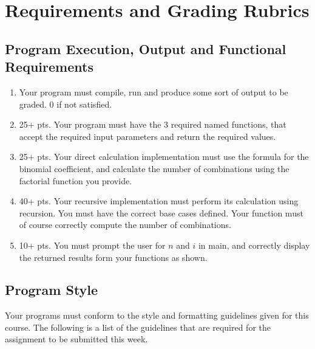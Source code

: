 \documentclass[11pt]{article}
\begin{document}
\section*{Requirements and Grading Rubrics}
\label{sec-5}
\subsection*{Program Execution, Output and Functional Requirements}
\label{sec-5-1}


\begin{enumerate}
\item Your program must compile, run and produce some sort of output to be
  graded. 0 if not satisfied.
\item 25+ pts.  Your program must have the 3 required named functions,
   that accept the required input parameters and return the required
   values.
\item 25+ pts. Your direct calculation implementation must use the formula
   for the binomial coefficient, and calculate the number of combinations
   using the factorial function you provide.
\item 40+ pts. Your recursive implementation must perform its calculation using
   recursion.  You must have the correct base cases defined.  Your function must
   of course correctly compute the number of combinations.
\item 10+ pts. You must prompt the user for $n$ and $i$ in main, and correctly display
   the returned results form your functions as shown.
\end{enumerate}
\subsection*{Program Style}
\label{sec-5-2}


Your programs must conform to the style and formatting guidelines
given for this course.  The following is a list of the guidelines that
are required for the assignment to be submitted this week.
\end{document}
